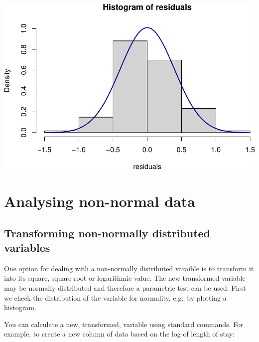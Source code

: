 \documentclass[
]{memoir}
\newenvironment{Shaded}{\begin{snugshade}}{\end{snugshade}}
\newcommand{\AttributeTok}[1]{\textcolor[rgb]{0.77,0.63,0.00}{#1}}
\newcommand{\DecValTok}[1]{\textcolor[rgb]{0.00,0.00,0.81}{#1}}
\newcommand{\FunctionTok}[1]{\textcolor[rgb]{0.00,0.00,0.00}{#1}}
\newcommand{\NormalTok}[1]{#1}
\newcommand{\OtherTok}[1]{\textcolor[rgb]{0.56,0.35,0.01}{#1}}
\newcommand{\SpecialCharTok}[1]{\textcolor[rgb]{0.00,0.00,0.00}{#1}}
\newcommand{\StringTok}[1]{\textcolor[rgb]{0.31,0.60,0.02}{#1}}
\begin{document}
\includegraphics{phcm9795-R-notes_files/figure-latex/unnamed-chunk-127-1.pdf}

\hypertarget{analysing-non-normal-data}{%
\chapter{Analysing non-normal data}\label{analysing-non-normal-data}}

\hypertarget{transforming-non-normally-distributed-variables}{%
\section{Transforming non-normally distributed variables}\label{transforming-non-normally-distributed-variables}}

One option for dealing with a non-normally distributed varaible is to transform it into its square, square root or logarithmic value. The new transformed variable may be normally distributed and therefore a parametric test can be used. First we check the distribution of the variable for normality, e.g.~by plotting a histogram.

You can calculate a new, transformed, variable using standard commands. For example, to create a new column of data based on the log of length of stay:

\begin{Shaded}
\end{Shaded}
\end{document}
